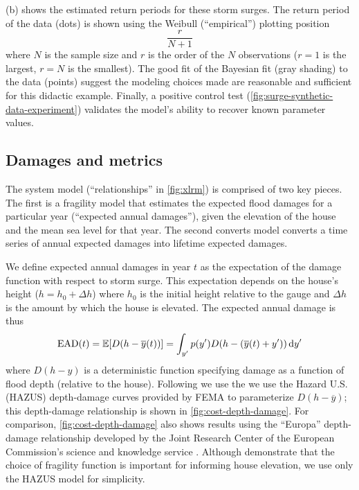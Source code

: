\documentclass[12pt]{article}
\begin{document}
(b) shows the estimated return periods for these storm surges.
The return period of the data (dots) is shown using the Weibull (``empirical'') plotting position
\begin{equation}\label{eq:plot-pos}
    \frac{r}{N + 1}
\end{equation}
where $N$ is the sample size and $r$ is the order of the $N$ observations ($r=1$ is the largest, $r=N$ is the smallest).
The good fit of the Bayesian fit (gray shading) to the data (points) suggest the modeling choices made are reasonable and sufficient for this didactic example.
Finally, a positive control test (\cref{fig:surge-synthetic-data-experiment}) validates the model's ability to recover known parameter values.

\subsection{Damages and metrics}\label{sec:ead-led}

The system model (``relationships'' in \cref{fig:xlrm}) is comprised of two key pieces.
The first is a fragility model that estimates the expected flood damages for a particular year (``expected annual damages''), given the elevation of the house and the mean sea level for that year.
The second converts model converts a time series of annual expected damages into lifetime expected damages.

We define expected annual damages in year $t$ as the expectation of the damage function with respect to storm surge.
This expectation depends on the house's height ($h = h_0 + \Delta h$) where $h_0$ is the initial height relative to the gauge and $\Delta h$ is the amount by which the house is elevated.
The expected annual damage is thus
\begin{equation}\label{eq:ead}
    \textrm{EAD}(t) = \mathbb{E}[D \qty(h-\overline{y}(t))] = \int_{y'} p(y') D \qty(h - \qty(\overline{y}(t) + y')) \dd{y'}
\end{equation}
where $D(h-y)$ is a deterministic function specifying damage as a function of flood depth (relative to the house).
Following \citet{zarekarizi_suboptimal:2020} we use the we use the Hazard U.S. (HAZUS) depth-damage curves provided by FEMA to parameterize $D(h-\overline{y})$; this depth-damage relationship is shown in \cref{fig:cost-depth-damage}.
For comparison, \cref{fig:cost-depth-damage} also shows results using the ``Europa'' depth-damage relationship developed by the Joint Research Center of the European Commission's science and knowledge service \citep{huizinga_depthdamage:2016}.
Although \citet{zarekarizi_suboptimal:2020} demonstrate that the choice of fragility function is important for informing house elevation, we use only the HAZUS model for simplicity.
\end{document}
